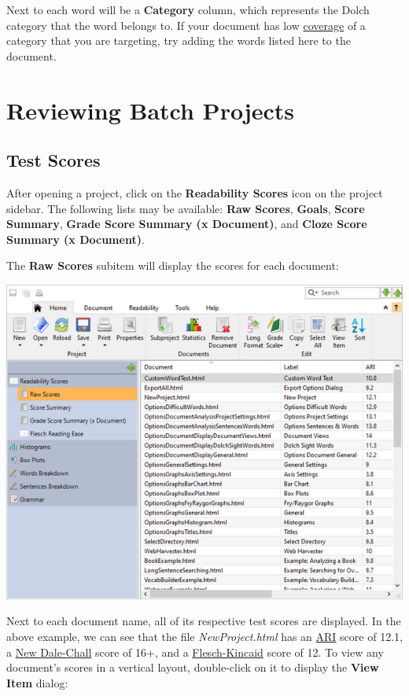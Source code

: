 \documentclass[
]{book}
\theoremstyle{definition}
\theoremstyle{definition}
\theoremstyle{definition}
\theoremstyle{definition}
\theoremstyle{remark}
\begin{document}
Next to each word will be a \textbf{Category} column, which represents the Dolch category that the word belongs to. If your document has low \protect\hyperlink{reviewing-dolch}{coverage} of a category that you are targeting, try adding the words listed here to the document.

\hypertarget{reviewing-batch-projects}{%
\chapter{Reviewing Batch Projects}\label{reviewing-batch-projects}}

\hypertarget{reviewing-batch-scores}{%
\section{Test Scores}\label{reviewing-batch-scores}}

After opening a project, click on the \textbf{Readability Scores} icon on the project sidebar. The following lists may be available: \textbf{Raw Scores}, \textbf{Goals}, \textbf{Score Summary}, \textbf{Grade Score Summary (x Document)}, and \textbf{Cloze Score Summary (x Document)}.

The \textbf{Raw Scores} subitem will display the scores for each document:

\includegraphics{Images/batchrawscores.png}

Next to each document name, all of its respective test scores are displayed. In the above example, we can see that the file \emph{NewProject.html} has an \protect\hyperlink{ari-test}{ARI} score of 12.1, a \protect\hyperlink{dale-chall-test}{New Dale-Chall} score of 16+, and a \protect\hyperlink{flesch-kincaid-test}{Flesch-Kincaid} score of 12. To view any document's scores in a vertical layout, double-click on it to display the \textbf{View Item} dialog:
\end{document}
